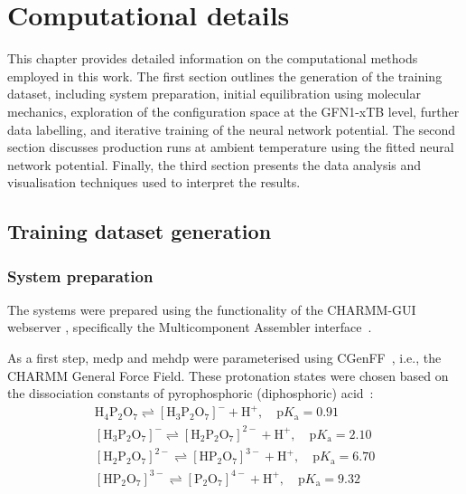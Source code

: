 \chapter{Computational details}
This chapter provides detailed information on the computational methods employed in this work. The first section outlines the generation of the training dataset, including system preparation, initial equilibration using molecular mechanics, exploration of the configuration space at the GFN1-xTB level, further data labelling, and iterative training of the neural network potential. The second section discusses production runs at ambient temperature using the fitted neural network potential. Finally, the third section presents the data analysis and visualisation techniques used to interpret the results.




\section{Training dataset generation}

\subsection{System preparation}
The systems were prepared using the functionality of the CHARMM-GUI webserver \citep{joCHARMMGUIWebbasedGraphical2008}, specifically the Multicomponent Assembler interface~\citep{kernCHARMMGUIMulticomponentAssembler2024}.

As a first step, \acf{medp} and \acf{mehdp} were parameterised using CGenFF~\citep{kimCHARMMGUILigandReader2017}, i.e., the CHARMM General Force Field. These protonation states were chosen based on the dissociation constants of pyrophosphoric (diphosphoric) acid~\citep{haynesCRCHandbookChemistry2016}:
\begin{align*}
    \mathrm{H_4P_2O_7} \rightleftharpoons \mathrm{[H_3P_2O_7]^-} + \mathrm{H^+},\quad \mathrm{p}K_\mathrm{a} = 0.91 \\
    \mathrm{[H_3P_2O_7]^-} \rightleftharpoons \mathrm{[H_2P_2O_7]^{2-}} + \mathrm{H^+},\quad \mathrm{p}K_\mathrm{a} = 2.10 \\
    \mathrm{[H_2P_2O_7]^{2-}} \rightleftharpoons \mathrm{[HP_2O_7]^{3-}} + \mathrm{H^+},\quad \mathrm{p}K_\mathrm{a} = 6.70 \\
    \mathrm{[HP_2O_7]^{3-}} \rightleftharpoons \mathrm{[P_2O_7]^{4-}} + \mathrm{H^+},\quad \mathrm{p}K_\mathrm{a} = 9.32
\end{align*}

